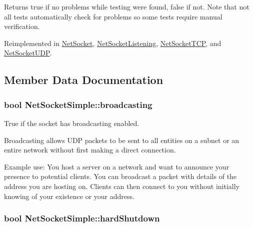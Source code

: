 \begin{DoxyReturn}{Returns}
true if no problems while testing were found, false if not. Note that not all tests automatically check for problems so some tests require manual verification. 
\end{DoxyReturn}


Reimplemented in \hyperlink{class_net_socket_ae2233dd5a751f07101b1347df5dfc308}{NetSocket}, \hyperlink{class_net_socket_listening_a397dd748e239d7638ead233d55c9b0dc}{NetSocketListening}, \hyperlink{class_net_socket_t_c_p_a844311ce7f1248d66b4e15d9e042e89a}{NetSocketTCP}, and \hyperlink{class_net_socket_u_d_p_a68728f4e9718f3f730a8f28c94a91968}{NetSocketUDP}.



\subsection{Member Data Documentation}
\hypertarget{class_net_socket_simple_ae423ed3be7d1b07d67dbdf34306bbc72}{
\subsubsection[{broadcasting}]{\setlength{\rightskip}{0pt plus 5cm}bool {\bf NetSocketSimple::broadcasting}}}
\label{class_net_socket_simple_ae423ed3be7d1b07d67dbdf34306bbc72}


True if the socket has broadcasting enabled. 

Broadcasting allows UDP packets to be sent to all entities on a subnet or an entire network without first making a direct connection.\par
\par


Example use: You host a server on a network and want to announce your presence to potential clients. You can broadcast a packet with details of the address you are hosting on. Clients can then connect to you without initially knowing of your existence or your address. \hypertarget{class_net_socket_simple_a713a67b50645a31ace94f50aa1bbc289}{
\subsubsection[{hardShutdown}]{\setlength{\rightskip}{0pt plus 5cm}bool {\bf NetSocketSimple::hardShutdown}}}
\label{class_net_socket_simple_a713a67b50645a31ace94f50aa1bbc289}


